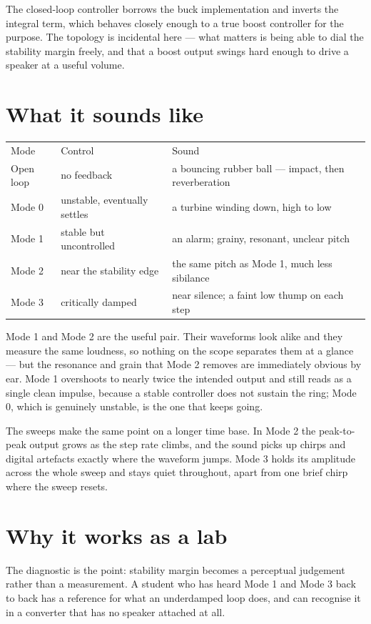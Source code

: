 The closed-loop controller borrows the buck implementation and inverts the
integral term, which behaves closely enough to a true boost controller for the
purpose. The topology is incidental here — what matters is being able to dial
the stability margin freely, and that a boost output swings hard enough to
drive a speaker at a useful volume.

\section{What it sounds like}

\begin{tabular}{lll}
  Mode & Control & Sound \\
  Open loop & no feedback & a bouncing rubber ball --- impact, then reverberation \\
  Mode 0 & unstable, eventually settles & a turbine winding down, high to low \\
  Mode 1 & stable but uncontrolled & an alarm; grainy, resonant, unclear pitch \\
  Mode 2 & near the stability edge & the same pitch as Mode 1, much less sibilance \\
  Mode 3 & critically damped & near silence; a faint low thump on each step \\
\end{tabular}

Mode 1 and Mode 2 are the useful pair. Their waveforms look alike and they
measure the same loudness, so nothing on the scope separates them at a glance
--- but the resonance and grain that Mode 2 removes are immediately obvious by
ear. Mode 1 overshoots to nearly twice the intended output and still reads as a
single clean impulse, because a stable controller does not sustain the ring;
Mode 0, which is genuinely unstable, is the one that keeps going.

The sweeps make the same point on a longer time base. In Mode 2 the
peak-to-peak output grows as the step rate climbs, and the sound picks up
chirps and digital artefacts exactly where the waveform jumps. Mode 3 holds its
amplitude across the whole sweep and stays quiet throughout, apart from one
brief chirp where the sweep resets.

\section{Why it works as a lab}

The diagnostic is the point: stability margin becomes a perceptual judgement
rather than a measurement. A student who has heard Mode 1 and Mode 3 back to
back has a reference for what an underdamped loop does, and can recognise it in
a converter that has no speaker attached at all.


